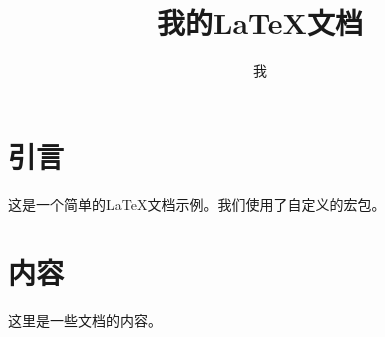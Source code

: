 \documentclass{mylatexpackage} %
\title{我的LaTeX文档}
\author{我}
\begin{document}
\maketitle

\section{引言}
这是一个简单的LaTeX文档示例。我们使用了自定义的宏包。

\section{内容}
这里是一些文档的内容。
\end{document}
